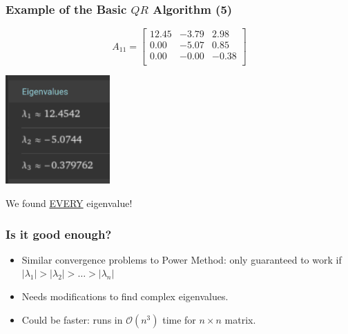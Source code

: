 \documentclass{beamer}
\begin{document}
\begin{frame}
	\frametitle{Example of the Basic $QR$ Algorithm (5)}
	\begin{equation*}
		A_{11} = 
		\begin{bmatrix}
			\boxed{12.45} & -3.79 & 2.98 \\
			0.00 & \boxed{-5.07} & 0.85 \\
			0.00 & -0.00 & \boxed{-0.38} \\
		\end{bmatrix}
	\end{equation*}
	\begin{center}
		\includegraphics[width=0.3\textwidth]{eigenvalues.png}

		We found \underline{EVERY} eigenvalue!
	\end{center}
\end{frame}

\begin{frame}
	\frametitle{Is it good enough?}
	\begin{itemize}
		\item<1-> Similar convergence problems to Power Method: only guaranteed to work if $\left|\lambda_1\right|>\left|\lambda_2\right|>\ldots>\left|\lambda_n\right|$
		\item<2-> Needs modifications to find complex eigenvalues.
		\item<3-> Could be faster: runs in $\mathcal O(n^3)$ time for $n\times n$ matrix.
	\end{itemize}
\end{frame}
\end{document}
